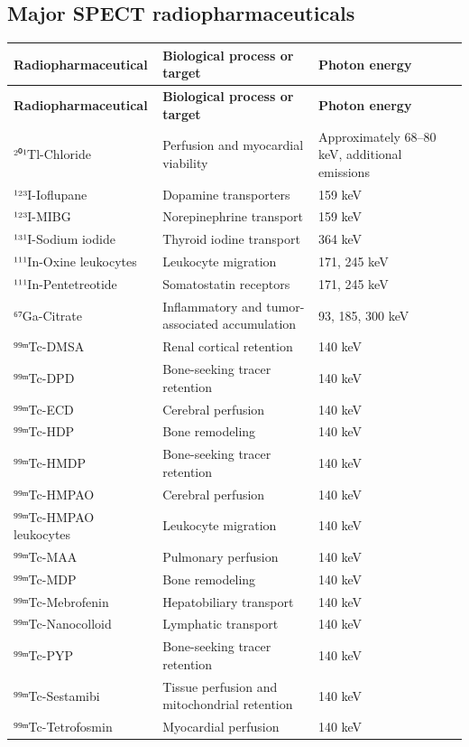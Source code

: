 \subsection{Major SPECT radiopharmaceuticals}
\begin{longtable}{@{}p{}p{}p{}@{}}
\toprule
\textbf{Radiopharmaceutical} & \textbf{Biological process or target} & \textbf{Photon energy} \\
\midrule
\endfirsthead
\toprule
\textbf{Radiopharmaceutical} & \textbf{Biological process or target} & \textbf{Photon energy} \\
\midrule
\endhead
²⁰¹Tl-Chloride & Perfusion and myocardial viability & Approximately 68--80 keV, additional emissions \\
¹²³I-Ioflupane & Dopamine transporters & 159 keV \\
¹²³I-MIBG & Norepinephrine transport & 159 keV \\
¹³¹I-Sodium iodide & Thyroid iodine transport & 364 keV \\
¹¹¹In-Oxine leukocytes & Leukocyte migration & 171, 245 keV \\
¹¹¹In-Pentetreotide & Somatostatin receptors & 171, 245 keV \\
⁶⁷Ga-Citrate & Inflammatory and tumor-associated accumulation & 93, 185, 300 keV \\
⁹⁹ᵐTc-DMSA & Renal cortical retention & 140 keV \\
⁹⁹ᵐTc-DPD & Bone-seeking tracer retention & 140 keV \\
⁹⁹ᵐTc-ECD & Cerebral perfusion & 140 keV \\
⁹⁹ᵐTc-HDP & Bone remodeling & 140 keV \\
⁹⁹ᵐTc-HMDP & Bone-seeking tracer retention & 140 keV \\
⁹⁹ᵐTc-HMPAO & Cerebral perfusion & 140 keV \\
⁹⁹ᵐTc-HMPAO leukocytes & Leukocyte migration & 140 keV \\
⁹⁹ᵐTc-MAA & Pulmonary perfusion & 140 keV \\
⁹⁹ᵐTc-MDP & Bone remodeling & 140 keV \\
⁹⁹ᵐTc-Mebrofenin & Hepatobiliary transport & 140 keV \\
⁹⁹ᵐTc-Nanocolloid & Lymphatic transport & 140 keV \\
⁹⁹ᵐTc-PYP & Bone-seeking tracer retention & 140 keV \\
⁹⁹ᵐTc-Sestamibi & Tissue perfusion and mitochondrial retention & 140 keV \\
⁹⁹ᵐTc-Tetrofosmin & Myocardial perfusion & 140 keV \\
\bottomrule
\end{longtable}

